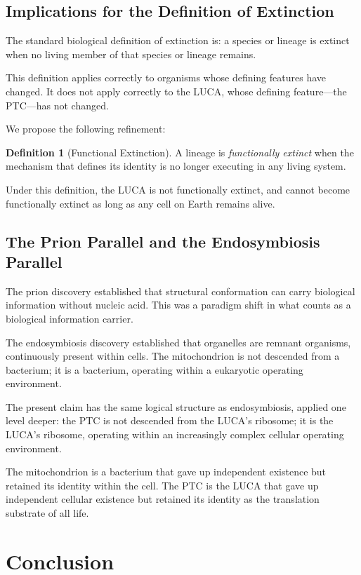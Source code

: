 \documentclass[11pt]{article}
\theoremstyle{definition}
\newtheorem{definition}{Definition}[section]
\begin{document}
\subsection{Implications for the Definition of Extinction}

The standard biological definition of extinction is:
a species or lineage is extinct when no living member
of that species or lineage remains.

This definition applies correctly to organisms whose
defining features have changed.
It does not apply correctly to the LUCA, whose defining
feature---the PTC---has not changed.

We propose the following refinement:

\begin{definition}[Functional Extinction]
A lineage is \emph{functionally extinct} when the mechanism
that defines its identity is no longer executing in any
living system.
\end{definition}

Under this definition, the LUCA is not functionally extinct,
and cannot become functionally extinct as long as any cell
on Earth remains alive.

\subsection{The Prion Parallel and the Endosymbiosis Parallel}

The prion discovery established that structural conformation
can carry biological information without nucleic acid.
This was a paradigm shift in what counts as a biological
information carrier.

The endosymbiosis discovery established that organelles
are remnant organisms, continuously present within cells.
The mitochondrion is not descended from a bacterium; it is
a bacterium, operating within a eukaryotic operating
environment.

The present claim has the same logical structure as
endosymbiosis, applied one level deeper:
the PTC is not descended from the LUCA's ribosome;
it is the LUCA's ribosome, operating within an increasingly
complex cellular operating environment.

The mitochondrion is a bacterium that gave up independent
existence but retained its identity within the cell.
The PTC is the LUCA that gave up independent cellular
existence but retained its identity as the translation
substrate of all life.

\section{Conclusion}
\end{document}
